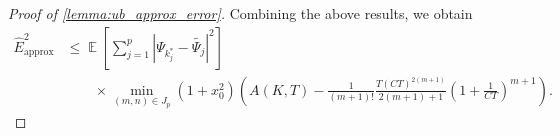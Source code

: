 \documentclass[10pt,a4paper]{amsart}
\DeclareMathOperator{\E}{\mathbb E}
\begin{document}
\begin{proof}[Proof of \cref{lemma:ub_approx_error}]
    Combining the above results, we obtain
    \begin{align*}
        \hat E_\text{approx}^2 &\leq \E\left[\sum_{j=1}^p |\Psi_{k_j^*}-\widetilde{\Psi_j}|^2\right]\\ &\qquad\times \min_{(m,n) \in J_p}(1+x_0^2)\left(A(K,T) - \frac{1}{(m+1)!}\frac{T(CT)^{2(m+1)}}{2(m+1)+1}\left(1+\frac{1}{CT}\right)^{m+1}\right).
    \end{align*}
\end{proof}
\end{document}
